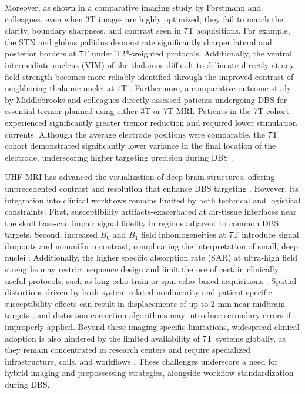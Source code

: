 Moreover, as shown in a comparative imaging study by Forstmann and colleagues, even when 3T images are highly optimized, they fail to match the clarity, boundary sharpness, and contrast seen in 7T acquisitions. For example, the STN and globus pallidus demonstrate significantly sharper lateral and posterior borders at 7T under T2*-weighted protocols. Additionally, the ventral intermediate nucleus (VIM) of the thalamus-difficult to delineate directly at any field strength-becomes more reliably identified through the improved contrast of neighboring thalamic nuclei at 7T \cite{Forstmann2017-gz}. Furthermore, a comparative outcome study by Middlebrooks and colleagues directly assessed patients undergoing DBS for essential tremor planned using either 3T or 7T MRI. Patients in the 7T cohort experienced significantly greater tremor reduction and required lower stimulation currents. Although the average electrode positions were comparable, the 7T cohort demonstrated significantly lower variance in the final location of the electrode, underscoring higher targeting precision during DBS \cite{Middlebrooks2024-gb}.

UHF MRI has advanced the visualization of deep brain structures, offering unprecedented contrast and resolution that enhance DBS targeting \cite{Isaacs2020-gq}. However, its integration into clinical workflows remains limited by both technical and logistical constraints. First, susceptibility artifacts-exacerbated at air-tissue interfaces near the skull base-can impair signal fidelity in regions adjacent to common DBS targets. Second, increased \(B_0\) and \(B_1\) field inhomogeneities at 7T introduce signal dropouts and nonuniform contrast, complicating the interpretation of small, deep nuclei \cite{Okada2022-fg}. Additionally, the higher specific absorption rate (SAR) at ultra-high field strengths may restrict sequence design and limit the use of certain clinically useful protocols, such as long echo-train or spin-echo–based acquisitions \cite{Okada2022-ln}. Spatial distortions-driven by both system-related nonlinearity and patient-specific susceptibility effects-can result in displacements of up to 2 mm near midbrain targets \cite{Kirby2023-la}, and distortion correction algorithms may introduce secondary errors if improperly applied. Beyond these imaging-specific limitations, widespread clinical adoption is also hindered by the limited availability of 7T systems globally, as they remain concentrated in research centers and require specialized infrastructure, coils, and workflows \cite{Forstmann2017-gz,Boutet2021-vg}. These challenges underscore a need for hybrid imaging and prepossessing strategies, alongside workflow standardization during DBS.

